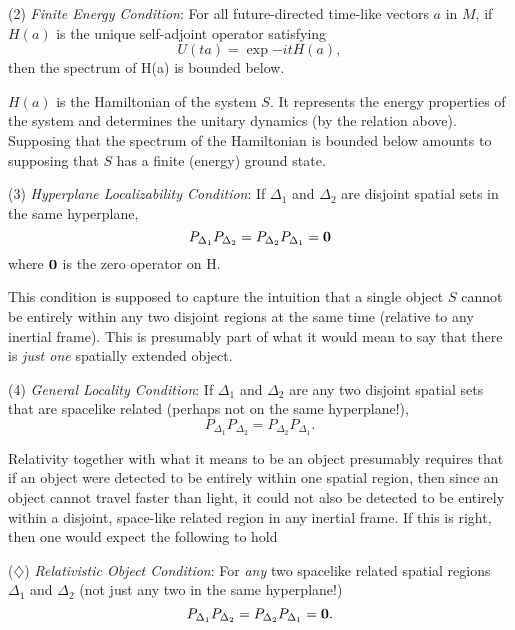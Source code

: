 \documentclass [12pt]{article}
\begin{document}
(2) {\em Finite Energy Condition}:  For all future-directed time-like vectors $a$
in $M$, if $H(a)$ is the unique
self-adjoint operator satisfying
\begin{equation}
U(t a)=\exp{-i t H(a)},
\end{equation}
then the spectrum of H(a) is bounded below.

$H(a)$ is the Hamiltonian of the system $S$.  It represents the energy properties
of the system and determines the unitary dynamics (by the relation above).
Supposing that the spectrum of the Hamiltonian is bounded below amounts to supposing
that $S$ has a finite (energy) ground state.

(3)  {\em Hyperplane Localizability Condition}:  If $\Delta_1$ and $\Delta_2$
are disjoint spatial sets in the same hyperplane,
\begin{equation}
P_{\Delta_1}P_{\Delta_2} = P_{\Delta_2}P_{\Delta_1} = \mbox{\bf 0}
\end{equation}
where $\mbox{\bf 0}$ is the zero operator on {\cal H}.

This condition is supposed to capture the intuition that a single object $S$
cannot be entirely within any two disjoint regions at the same time (relative to any inertial frame).  This
is presumably part of what it would mean to say that there is {\em just one\/}
spatially extended object.

(4)  {\em General Locality Condition}:  If $\Delta_1$ and $\Delta_2$ are any two disjoint spatial
sets that are spacelike related (perhaps not on the same hyperplane!),
\begin{equation}
P_{\Delta_1}P_{\Delta_2} = P_{\Delta_2}P_{\Delta_1}.
\end{equation}

Relativity together with what it means to be an object presumably requires
that if an object were detected to be entirely within one spatial region, then since
an object cannot travel faster than light, it
could not also be detected to be entirely within a disjoint,
space-like related region in any inertial frame.  If this is right, then one would
expect the following to hold

($\diamondsuit$)  {\em Relativistic Object Condition\/}:  For {\em any\/} two spacelike
related spatial regions $\Delta_1$ and $\Delta_2$ (not just
any two in the same hyperplane!)
\begin{equation}
P_{\Delta_1}P_{\Delta_2} = P_{\Delta_2}P_{\Delta_1} = \mbox{\bf 0}.
\end{equation}
\end{document}
